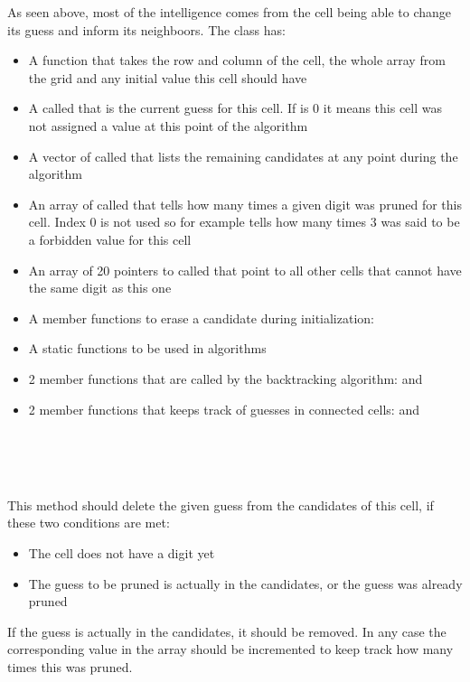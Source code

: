 \documentclass{ecnreport}
\begin{document}
As seen above, most of the intelligence comes from the cell being able to change its guess and inform its neighboors.
The \Cell class has:
\begin{itemize}
 \item A  function that takes the row and column of the cell, the whole  array from the grid and any initial value this cell should have
 \item A  called  that is the current guess for this cell. If  is 0 it means this cell was not assigned a value at this point of the algorithm
 \item A vector of  called  that lists the remaining candidates at any point during the algorithm
 \item An array of  called  that tells how many times a given digit was pruned for this cell. Index 0 is not used so for example  tells how many times 3 was said to be a forbidden value for this cell
 \item An array of 20 pointers to \Cell called  that point to all other cells that cannot have the same digit as this one
 \item A member functions to erase a candidate during initialization: 
 \item A static functions  to be used in algorithms
 \item 2 member functions that are called by the backtracking algorithm:  and 
 \item 2 member functions that keeps track of guesses in connected cells:  and 
\end{itemize}


\paragraph{\bf {}}~\\

 \begin{minipage}{.5cm}
~
 \end{minipage}
 \begin{minipage}{0.9\linewidth}
    This method should delete the given guess from the candidates of this cell, if these two conditions are met:

\begin{itemize}
 \item The cell does not have a digit yet
 \item The guess to be pruned is actually in the candidates, or the guess was already pruned
\end{itemize}

If the guess is actually in the candidates, it should be removed. In any case the corresponding value in the  array should be incremented to keep track how many times this was pruned.
 \end{minipage}
\end{document}
